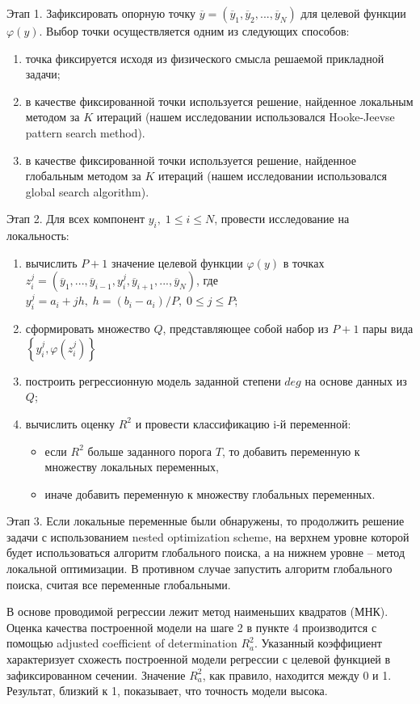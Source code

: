 \documentclass{aip-cp}
\begin{document}
Этап 1. Зафиксировать опорную точку $\overline{y} = (\overline{y}_1, \overline{y}_2,...,\overline{y}_N)$ для целевой функции $\varphi(y)$. Выбор точки осуществляется одним из следующих способов:
\begin{enumerate}
\item точка фиксируется исходя из физического смысла решаемой прикладной задачи;
\item в качестве фиксированной точки используется решение, найденное локальным методом за $K$ итераций (нашем исследовании использовался Hooke-Jeevse pattern search method).
\item в качестве фиксированной точки используется решение, найденное глобальным методом за $K$ итераций (нашем исследовании использовался global search algorithm).
\end{enumerate}

Этап 2. Для всех компонент $y_i, \; 1\leq i \leq N$, провести исследование на локальность:
\begin{enumerate}
\item вычислить $P+1$ значение целевой функции $\varphi(y)$ в точках $z_i^j = (\overline{y}_1,...,\overline{y}_{i-1},y_i^j,\overline{y}_{i+1},...,\overline{y}_N)$, где
$y_i^j =  a_i + jh, \; h=(b_i-a_i)/P, \; 0\leq j \leq P$;
\item сформировать множество $Q$, представляющее собой набор из $P+1$ пары вида $\left\{y_i^j, \varphi(z_i^j)\right\} $ 
\item построить регрессионную модель заданной степени $deg$ на основе данных из $Q$;
\item вычислить оценку $R^2$ и провести классификацию i-й переменной:
\begin{itemize}
\item если $R^2$ больше заданного порога $T$, то добавить переменную к множеству локальных переменных,
\item иначе добавить переменную к множеству глобальных переменных.
\end{itemize}
\end{enumerate}

Этап 3. Если локальные переменные были обнаружены, то продолжить решение задачи с использованием nested optimization scheme, на верхнем уровне которой будет использоваться алгоритм глобального поиска, а на нижнем уровне -- метод локальной оптимизации. В противном случае запустить алгоритм глобального поиска, считая все переменные глобальными.

В основе проводимой регрессии лежит метод наименьших квадратов (МНК). Оценка качества построенной модели на шаге 2 в пункте 4 производится с помощью adjusted coefficient of determination $R^2_a$. Указанный коэффициент характеризует схожесть построенной модели регрессии с целевой функцией в зафиксированном сечении. Значение $R^2_a$, как правило, находится между 0 и 1. Результат, близкий к 1, показывает, что точность модели высока.
\end{document}
